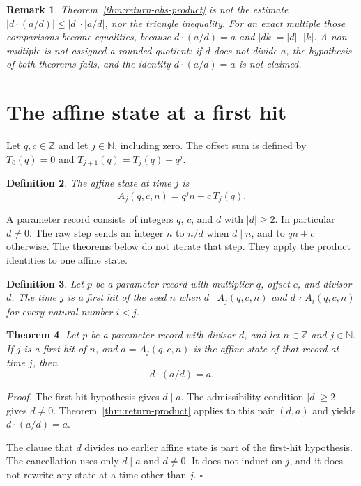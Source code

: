 \documentclass[11pt,letterpaper]{article}
\newcommand{\N}{\mathbb{N}}
\newcommand{\Z}{\mathbb{Z}}
\newtheorem{theorem}{Theorem}
\newtheorem{definition}[theorem]{Definition}
\newtheorem{remark}[theorem]{Remark}
\newenvironment{proof}{\noindent\textit{Proof.}}{\hfill\(\square\)}
\begin{document}
\begin{remark}
\label{rem:not-triangle}
Theorem~\ref{thm:return-abs-product} is not the estimate
\(|d\cdot(a/d)|\le |d|\cdot|a/d|\), nor the triangle inequality. For an exact
multiple those comparisons become equalities, because
\(d\cdot(a/d)=a\) and \(|dk|=|d|\cdot|k|\). A non-multiple is not assigned a
rounded quotient: if \(d\) does not divide \(a\), the hypothesis of both
theorems fails, and the identity \(d\cdot(a/d)=a\) is not claimed.
\end{remark}

\section{The affine state at a first hit}

Let \(q,c\in\Z\) and let \(j\in\N\), including zero. The offset sum is defined
by \(T_0(q)=0\) and \(T_{j+1}(q)=T_j(q)+q^j\).

\begin{definition}
\label{def:affine-state}
The affine state at time \(j\) is
\[
A_j(q,c,n)=q^j n+c\,T_j(q).
\]
\end{definition}

A parameter record consists of integers \(q\), \(c\), and \(d\) with
\(|d|\ge 2\). In particular \(d\neq 0\). The raw step sends an integer \(n\) to
\(n/d\) when \(d\mid n\), and to \(qn+c\) otherwise. The theorems below do not
iterate that step. They apply the product identities to one affine state.

\begin{definition}
\label{def:first-hit}
Let \(p\) be a parameter record with multiplier \(q\), offset \(c\), and
divisor \(d\). The time \(j\) is a first hit of the seed \(n\) when
\(d\mid A_j(q,c,n)\) and \(d\nmid A_i(q,c,n)\) for every natural number
\(i<j\).
\end{definition}

\begin{theorem}
\label{thm:return-product-hit}
Let \(p\) be a parameter record with divisor \(d\), and let \(n\in\Z\) and
\(j\in\N\). If \(j\) is a first hit of \(n\), and \(a=A_j(q,c,n)\) is the
affine state of that record at time \(j\), then
\[
d\cdot(a/d)=a.
\]
\end{theorem}

\begin{proof}
The first-hit hypothesis gives \(d\mid a\). The admissibility condition
\(|d|\ge 2\) gives \(d\neq 0\). Theorem~\ref{thm:return-product} applies to
this pair \((d,a)\) and yields \(d\cdot(a/d)=a\).

The clause that \(d\) divides no earlier affine state is part of the
first-hit hypothesis. The cancellation uses only \(d\mid a\) and \(d\neq 0\).
It does not induct on \(j\), and it does not rewrite any state at a time
other than \(j\).
\end{proof}
\end{document}
